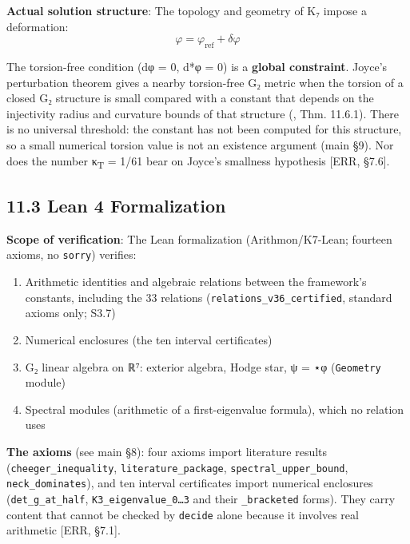 \documentclass[11pt,a4paper]{article}
\begin{document}
\textbf{Actual solution structure}: The topology and geometry of K₇ impose a deformation: \[\varphi = \varphi_{\text{ref}} + \delta\varphi\]

The torsion-free condition (dφ = 0, d*φ = 0) is a \textbf{global constraint}. Joyce's perturbation theorem gives a nearby torsion-free G₂ metric when the torsion of a closed G₂ structure is small compared with a constant that depends on the injectivity radius and curvature bounds of that structure (\cite{20}, Thm. 11.6.1). There is no universal threshold: the constant has not been computed for this structure, so a small numerical torsion value is not an existence argument (main §9). Nor does the number κ\textsubscript{T} = 1/61 bear on Joyce's smallness hypothesis {[}ERR, §7.6{]}.

\subsection{11.3 Lean 4 Formalization}\label{lean-4-formalization}

\textbf{Scope of verification}: The Lean formalization (Arithmon/K7-Lean; fourteen axioms, no \texttt{sorry}) verifies:

\begin{enumerate}
\def\labelenumi{\arabic{enumi}.}
\tightlist
\item
  Arithmetic identities and algebraic relations between the framework's constants, including the 33 relations (\texttt{relations\_\allowbreak{}v36\_\allowbreak{}certified}, standard axioms only; S3.7)
\item
  Numerical enclosures (the ten interval certificates)
\item
  G₂ linear algebra on ℝ⁷: exterior algebra, Hodge star, ψ = ⋆φ (\texttt{Geometry} module)
\item
  Spectral modules (arithmetic of a first-eigenvalue formula), which no relation uses
\end{enumerate}

\textbf{The axioms} (see main §8): four axioms import literature results (\texttt{cheeger\_\allowbreak{}inequality}, \texttt{literature\_\allowbreak{}package}, \texttt{spectral\_\allowbreak{}upper\_\allowbreak{}bound}, \texttt{neck\_\allowbreak{}dominates}), and ten interval certificates import numerical enclosures (\texttt{det\_\allowbreak{}g\_\allowbreak{}at\_\allowbreak{}half}, \texttt{K3\_\allowbreak{}eigenvalue\_\allowbreak{}0…3} and their \texttt{\_\allowbreak{}bracketed} forms). They carry content that cannot be checked by \texttt{decide} alone because it involves real arithmetic {[}ERR, §7.1{]}.
\end{document}
